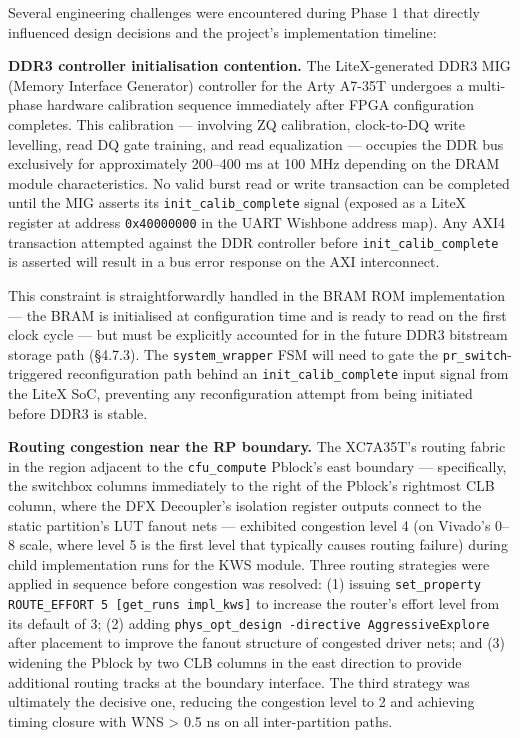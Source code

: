 Several engineering challenges were encountered during Phase 1 that directly influenced design decisions and the project's implementation timeline:

\textbf{DDR3 controller initialisation contention.} The LiteX-generated DDR3 MIG (Memory Interface Generator) controller for the Arty A7-35T undergoes a multi-phase hardware calibration sequence immediately after FPGA configuration completes. This calibration — involving ZQ calibration, clock-to-DQ write levelling, read DQ gate training, and read equalization — occupies the DDR bus exclusively for approximately 200–400 ms at 100 MHz depending on the DRAM module characteristics. No valid burst read or write transaction can be completed until the MIG asserts its \texttt{init\_calib\_complete} signal (exposed as a LiteX register at address \texttt{0x40000000} in the UART Wishbone address map). Any AXI4 transaction attempted against the DDR controller before \texttt{init\_calib\_complete} is asserted will result in a bus error response on the AXI interconnect.

This constraint is straightforwardly handled in the BRAM ROM implementation — the BRAM is initialised at configuration time and is ready to read on the first clock cycle — but must be explicitly accounted for in the future DDR3 bitstream storage path (§4.7.3). The \texttt{system\_wrapper} FSM will need to gate the \texttt{pr\_switch}-triggered reconfiguration path behind an \texttt{init\_calib\_complete} input signal from the LiteX SoC, preventing any reconfiguration attempt from being initiated before DDR3 is stable.

\textbf{Routing congestion near the RP boundary.} The XC7A35T's routing fabric in the region adjacent to the \texttt{cfu\_compute} Pblock's east boundary — specifically, the switchbox columns immediately to the right of the Pblock's rightmost CLB column, where the DFX Decoupler's isolation register outputs connect to the static partition's LUT fanout nets — exhibited congestion level 4 (on Vivado's 0–8 scale, where level 5 is the first level that typically causes routing failure) during child implementation runs for the KWS module. Three routing strategies were applied in sequence before congestion was resolved: (1) issuing \texttt{set\_property ROUTE\_EFFORT 5 [get\_runs impl\_kws]} to increase the router's effort level from its default of 3; (2) adding \texttt{phys\_opt\_design -directive AggressiveExplore} after placement to improve the fanout structure of congested driver nets; and (3) widening the Pblock by two CLB columns in the east direction to provide additional routing tracks at the boundary interface. The third strategy was ultimately the decisive one, reducing the congestion level to 2 and achieving timing closure with WNS \textgreater{} 0.5 ns on all inter-partition paths.

